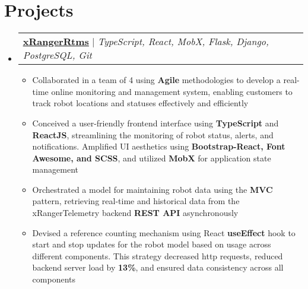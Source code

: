 \documentclass[letterpaper,11pt]{article}
\makeatletter
\newcommand{\resumeItem}[1]{
  \item\small{
    {#1 \vspace{-2pt}}
  }
}
\newcommand{\resumeProjectHeading}[2]{
    \item
    \begin{tabular*}{0.97\textwidth}{l@{\extracolsep{\fill}}r}
      \small#1 & #2 \\
    \end{tabular*}\vspace{-7pt}
}
\newcommand{\resumeSubHeadingListStart}{\begin{itemize}[leftmargin=0.15in, label={}]}
\newcommand{\resumeSubHeadingListEnd}{\end{itemize}}
\newcommand{\resumeItemListStart}{\begin{itemize}}
\newcommand{\resumeItemListEnd}{\end{itemize}\vspace{-5pt}}
\makeatother
\begin{document}
\section{Projects}
    \resumeSubHeadingListStart
      \resumeProjectHeading
          {\textbf{\underline{\href{https://github.com/xRanger-RTMS}{xRangerRtms}}} $|$ \emph{TypeScript, React, MobX, Flask, Django, PostgreSQL, Git}}{}
          \resumeItemListStart
            \resumeItem{Collaborated in a team of 4 using \textbf{Agile} methodologies to develop a real-time online monitoring and management system, enabling customers to track robot locations and statuses effectively and efficiently}
            \resumeItem{Conceived a user-friendly frontend interface using \textbf{TypeScript} and \textbf{ReactJS}, streamlining the monitoring of robot status, alerts, and notifications. Amplified UI aesthetics using \textbf{Bootstrap-React, Font Awesome, and SCSS}, and utilized \textbf{MobX} for application state management}
            \resumeItem{Orchestrated a model for maintaining robot data using the \textbf{MVC} pattern, retrieving real-time and historical data from the xRangerTelemetry backend \textbf{REST API} asynchronously}
            \resumeItem{Devised a reference counting mechanism using React \textbf{useEffect} hook to start and stop updates for the robot model based on usage across different components. This strategy decreased http requests, reduced backend server load by \textbf{13\%}, and ensured data consistency across all components}
          \resumeItemListEnd
    \resumeSubHeadingListEnd


\end{document}
